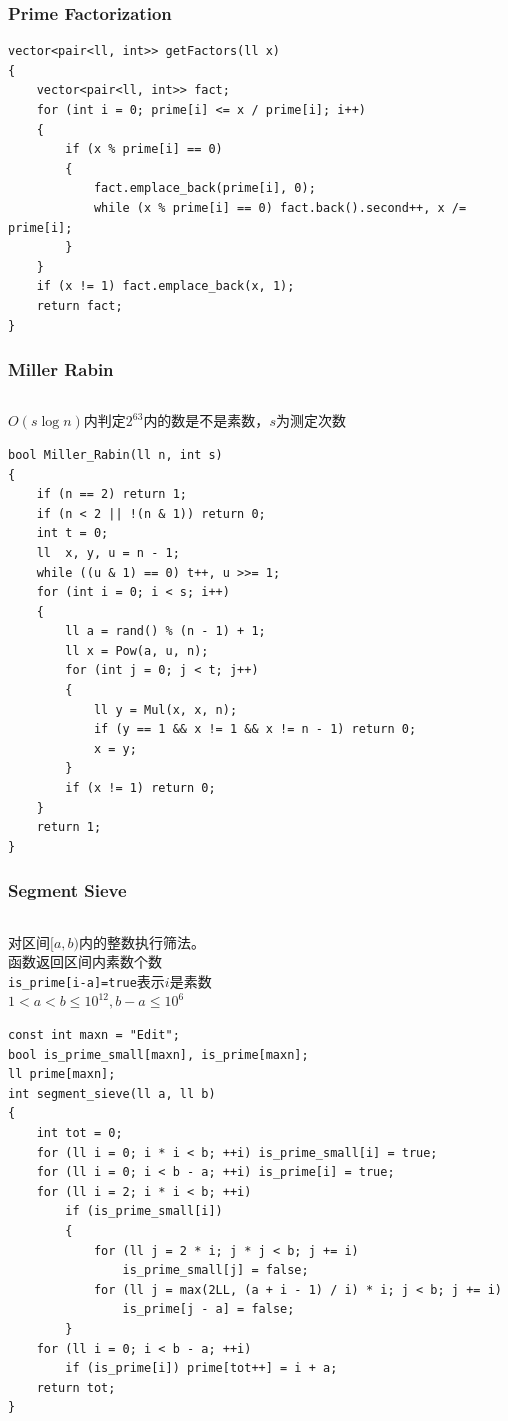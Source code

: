 \documentclass[twoside]{article}
\begin{document}
\subsubsection{Prime Factorization}
\begin{lstlisting}
vector<pair<ll, int>> getFactors(ll x)
{
    vector<pair<ll, int>> fact;
    for (int i = 0; prime[i] <= x / prime[i]; i++)
    {
        if (x % prime[i] == 0)
        {
            fact.emplace_back(prime[i], 0);
            while (x % prime[i] == 0) fact.back().second++, x /= prime[i];
        }
    }
    if (x != 1) fact.emplace_back(x, 1);
    return fact;
}\end{lstlisting}
\subsubsection{Miller Rabin}
\begin{lstlisting}
\end{lstlisting}
$O(s\log n)$内判定$2^{63}$内的数是不是素数，$s$为测定次数
\begin{lstlisting}
bool Miller_Rabin(ll n, int s)
{
    if (n == 2) return 1;
    if (n < 2 || !(n & 1)) return 0;
    int t = 0;
    ll  x, y, u = n - 1;
    while ((u & 1) == 0) t++, u >>= 1;
    for (int i = 0; i < s; i++)
    {
        ll a = rand() % (n - 1) + 1;
        ll x = Pow(a, u, n);
        for (int j = 0; j < t; j++)
        {
            ll y = Mul(x, x, n);
            if (y == 1 && x != 1 && x != n - 1) return 0;
            x = y;
        }
        if (x != 1) return 0;
    }
    return 1;
}
\end{lstlisting}
\subsubsection{Segment Sieve}
\begin{lstlisting}
\end{lstlisting}
对区间$[a,b)$内的整数执行筛法。\\
函数返回区间内素数个数\\
\texttt{is\_prime[i-a]=true}表示$i$是素数\\
$1<a<b \le 10^{12}, b-a \le 10^6$
\begin{lstlisting}
const int maxn = "Edit";
bool is_prime_small[maxn], is_prime[maxn];
ll prime[maxn];
int segment_sieve(ll a, ll b)
{
    int tot = 0;
    for (ll i = 0; i * i < b; ++i) is_prime_small[i] = true;
    for (ll i = 0; i < b - a; ++i) is_prime[i] = true;
    for (ll i = 2; i * i < b; ++i)
        if (is_prime_small[i])
        {
            for (ll j = 2 * i; j * j < b; j += i)
                is_prime_small[j] = false;
            for (ll j = max(2LL, (a + i - 1) / i) * i; j < b; j += i)
                is_prime[j - a] = false;
        }
    for (ll i = 0; i < b - a; ++i)
        if (is_prime[i]) prime[tot++] = i + a;
    return tot;
}
\end{lstlisting}
\end{document}
